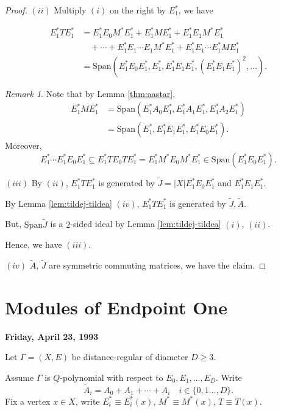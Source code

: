 \documentclass[
]{book}
\theoremstyle{definition}
\theoremstyle{definition}
\theoremstyle{definition}
\theoremstyle{definition}
\theoremstyle{remark}
\newtheorem*{remark}{Remark}
\begin{document}
\begin{proof}
\((ii)\) Multiply \((i)\) on the right by \(E^*_1\), we have

\begin{align}
E^*_1TE^*_1 & = E^*_1E_0M^*E^*_1 + E^*_1ME^*_1 + E^*_1E_1M^*E^*_1\\
& \quad + \cdots + E^*_1E_1\cdots E_1M^*E^*_1 + E^*_1E_1\cdots E^*_1ME^*_1\\
& = \mathrm{Span}(E^*_1E_0E^*_1, E^*_1, E^*_1E_1E^*_1, (E^*_1E_1E^*_1)^2, \ldots).
\end{align}

\begin{remark}
Note that by Lemma \ref{thm:aastar},
\begin{align}
E^*_1ME^*_1 & = \mathrm{Span}(E^*_1A_0E^*_1, E^*_1A_1E^*_1, E^*_1A_2E^*_1)\\
& = \mathrm{Span}(E^*_1, E^*_1E_1E^*_1, E^*_1E_0E^*_1).
\end{align}
Moreover,
\[E^*_1\cdots E^*_1E_0E^*_1 \subseteq E^*_1TE_0TE^*_1 = E^*_1M^*E_0M^*E^*_1 \in \mathrm{Span}(E^*_1E_0E^*_1).\]
\end{remark}

\((iii)\) By \((ii)\), \(E^*_1TE^*_1\) is generated by \(\tilde{J} = |X|E^*_1E_0E^*_1\) and \(E^*_1E_1E^*_1\).

By Lemma \ref{lem:tildej-tildea} \((iv)\), \(E^*_1TE^*_1\) is generated by \(\tilde{J}, \tilde{A}\).

But, \(\mathrm{Span}{\tilde{J}}\) is a \(2\)-sided ideal by Lemma \ref{lem:tildej-tildea} \((i)\), \((ii)\).

Hence, we have \((iii)\).

\((iv)\) \(\tilde{A}\), \(\tilde{J}\) are symmetric commuting matrices, we have the claim.

\end{proof}

\hypertarget{lec34}{%
\chapter{Modules of Endpoint One}\label{lec34}}

\textbf{Friday, April 23, 1993}

Let \(\Gamma = (X,E)\) be distance-regular of diameter \(D\geq 3\).

Assume \(\Gamma\) is \(Q\)-polynomial with respect to \(E_0, E_1, \ldots, E_D\). Write
\[\tilde{A}_i = A_0 + A_1 + \cdots + A_i \quad i\in \{0, 1\ldots, D\}.\]
Fix a vertex \(x\in X\), write \(E^*_i \equiv E^*_i(x)\), \(M^* \equiv M^*(x)\), \(T\equiv T(x)\).
\end{document}
